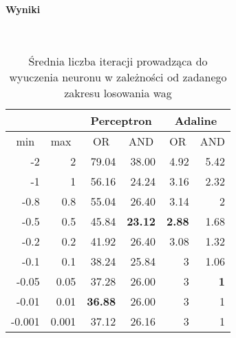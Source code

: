 \documentclass{article}
\begin{document}
	\paragraph{Wyniki}\mbox{}\\
	\begin{table}[H]
		\centering
		\caption{Średnia liczba iteracji prowadząca do wyuczenia neuronu w zależności od zadanego zakresu losowania wag}
		\label{tab:weights-random}
		\begin{tabular}{|r|r|r|r|r|r|}
		\hline
		\multicolumn{1}{|c|}{}    & \multicolumn{1}{l|}{}    & \multicolumn{2}{c|}{Perceptron}                    & \multicolumn{2}{c|}{Adaline}                       \\ \hline
		\multicolumn{1}{|c|}{min} & \multicolumn{1}{l|}{max} & \multicolumn{1}{c|}{OR} & \multicolumn{1}{c|}{AND} & \multicolumn{1}{c|}{OR} & \multicolumn{1}{c|}{AND} \\ \hline
		-2                        & 2                        & 79.04                   & 38.00                    & 4.92                    & 5.42                     \\ \hline
		-1                        & 1                        & 56.16                   & 24.24                    & 3.16                    & 2.32                     \\ \hline
		-0.8                      & 0.8                      & 55.04                   & 26.40                    & 3.14                    & 2                        \\ \hline
		-0.5                      & 0.5                      & 45.84                   & \textbf{23.12}           & \textbf{2.88}           & 1.68                     \\ \hline
		-0.2                      & 0.2                      & 41.92                   & 26.40                    & 3.08                    & 1.32                     \\ \hline
		-0.1                      & 0.1                      & 38.24                   & 25.84                    & 3                       & 1.06                     \\ \hline
		-0.05                     & 0.05                     & 37.28                   & 26.00                    & 3                       & \textbf{1}               \\ \hline
		-0.01                     & 0.01                     & \textbf{36.88}          & 26.00                    & 3                       & 1                        \\ \hline
		-0.001                    & 0.001                    & 37.12                   & 26.16                    & 3                       & 1                        \\ \hline
		\end{tabular}
		\end{table}
\end{document}
